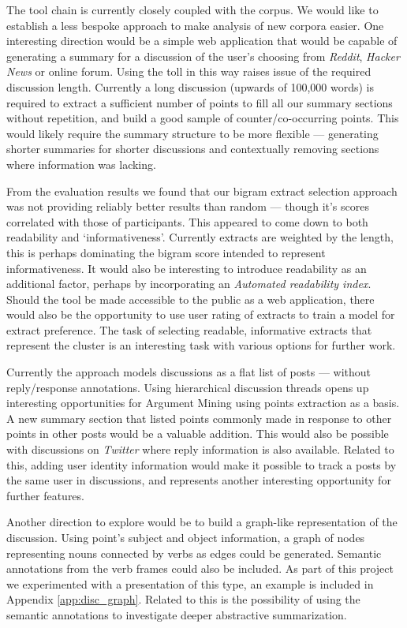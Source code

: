     The tool chain is currently closely coupled with the corpus. We would like to establish a less bespoke approach to make analysis of new corpora easier. One interesting direction would be a simple web application that would be capable of generating a summary for a discussion of the user's choosing from \textit{Reddit}, \textit{Hacker News} or online forum. Using the toll in this way raises issue of the required discussion length. Currently a long discussion (upwards of 100,000 words) is required to extract a sufficient number of points to fill all our summary sections without repetition, and build a good sample of counter/co-occurring points. This would likely require the summary structure to be more flexible --- generating shorter summaries for shorter discussions and contextually removing sections where information was lacking.

    From the evaluation results we found that our bigram extract selection approach was not providing reliably better results than random --- though it's scores correlated with those of participants. This appeared to come down to both readability and `informativeness'. Currently extracts are weighted by the length, this is perhaps dominating the bigram score intended to represent informativeness. It would also be interesting to introduce readability as an additional factor, perhaps by incorporating an \textit{Automated readability index}. Should the tool be made accessible to the public as a web application, there would also be the opportunity to use user rating of extracts to train a model for extract preference. The task of selecting readable, informative extracts that represent the cluster is an interesting task with various options for further work.

    Currently the approach models discussions as a flat list of posts --- without reply/response annotations. Using hierarchical discussion threads opens up interesting opportunities for Argument Mining using points extraction as a basis. A new summary section that listed points commonly made in response to other points in other posts would be a valuable addition. This would also be possible with discussions on \textit{Twitter} where reply information is also available. Related to this, adding user identity information would make it possible to track a posts by the same user in discussions, and represents another interesting opportunity for further features.

    Another direction to explore would be to build a graph-like representation of the discussion. Using point's subject and object information, a graph of nodes representing nouns connected by verbs as edges could be generated. Semantic annotations from the verb frames could also be included. As part of this project we experimented with a presentation of this type, an example is included in Appendix \ref{app:disc_graph}. Related to this is the possibility of using the semantic annotations to investigate deeper abstractive summarization.

